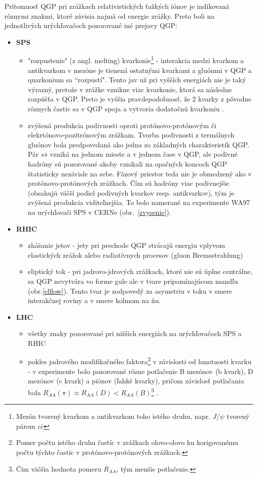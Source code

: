 \documentclass[thesismargins, thesislinespacing]{rnthesis}
\begin{document}
Prítomnosť QGP pri zrážkach relativistických ťažkých iónov je indikovaná rôznymi znakmi, ktoré závisia najmä od energie zrážky. Preto boli na jednotlivých urýchľovačoch pozorované iné prejavy QGP:
\begin{itemize}
	\item \textbf{SPS}
	\begin{itemize}
		\item "rozpustenie" (z angl. melting) kvarkonie\footnote{Mezón tvorený kvarkom a antikvarkom toho istého druhu, napr. $J/ \psi$ tvorený párom $c \bar{c}$ } - interakcia medzi kvarkom a antikvarkom v mezóne je tienená ostatnými kvarkami a gluónmi v QGP a quarkonium sa “rozpustí". Tento jav už pri vyšších energiách nie je taký výrazný, pretože v zrážke vznikne viac kvarkonie, ktorá sa následne rozpúšťa v QGP. Preto je vyššia pravdepodobnosť, že 2 kvarky z pôvodne rôznych častíc sa v QGP spoja a vytvoria dodatočnú kvarkoniu \cite{JpsiSupp}.
		\item zvýšená produkcia podivnosti oproti protónovo-protónovým či elekrtónovo-pozitrónovým zrážkam. Tvorba podivnosti z termálnych gluónov bola predpovedaná ako jedna zo \-zák\-lad\-ných charakteristík QGP. Pár $s \bar{s}$ vzniká na jednom mieste a v jednom čase v QGP, ale podivné hadróny sú pozorované akoby vznikali na opačných koncoch QGP štatisticky nezávisle na sebe. Fázový priestor  teda nie je obmedzený ako v protónovo-protónových zrážkach.
		Čím sú hadróny viac podivnejšie (obsahujú väčší podiel podivných kvarkov resp. antikvarkov), tým je zvýšená produkcia viditeľnejšia. To bolo namerané na experimente WA97 na urýchľovači SPS v CERNe (obr.~\ref{zvysenie}).
	\end{itemize}
	\item \textbf{RHIC}
	\begin{itemize}
		\item zhášanie jetov - jety pri prechode QGP strácajú energiu vplyvom elastických zrážok alebo radiatívnych procesov (gluon Bremsstrahlung)
		\item eliptický tok - pri jadrovo-jdrových zrážkach, ktoré nie sú úplne centrálne, sa QGP nevytvára vo forme gule ale v tvare pripomínajúcom mandľu (obr.\ref{elflow}). Tento tvar je zodpovedý za asymetriu v toku v smere interakčnej roviny a v smere kolmom na ňu. 
	\end{itemize}
	\item \textbf{LHC}
	\begin{itemize}
		\item všetky znaky pozorované pri nižších energiách na urýchľovačoch SPS a RHIC
		\item pokles jadrového modifikačného faktora\footnote{Pomer počtu istého druhu častíc v zrážkach olovo-olovo ku korigovanému počtu týchto častíc v protónovo-protónových zrážkach.} v závislosti od hmotnosti kvarku - v experimente bolo pozorované rôzne potlačenie B mezónov (b kvark), D mezónov (c kvark) a piónov (ľahké kvarky), pričom závislosť potlačania bola $R_{AA}(\pi)\approx R_{AA} (D)<R_{AA}(B)$\footnote{Čím väčšia hodnota pomeru $R_{AA}$, tým menšie potlačenie.} \cite{RAA}. 
		
	\end{itemize}
\end{itemize}
\end{document}
